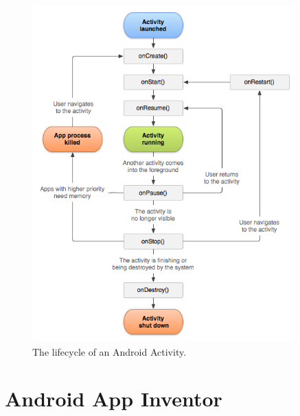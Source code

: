 \begin{figure}[h!]
\centering
\includegraphics[width=0.9\textwidth]{images/chap4_activity_lifecycle.png}
\caption{The lifecycle of an Android Activity.}
\label{fig:activity_lifecycle}
\end{figure}

\section{Android App Inventor}

